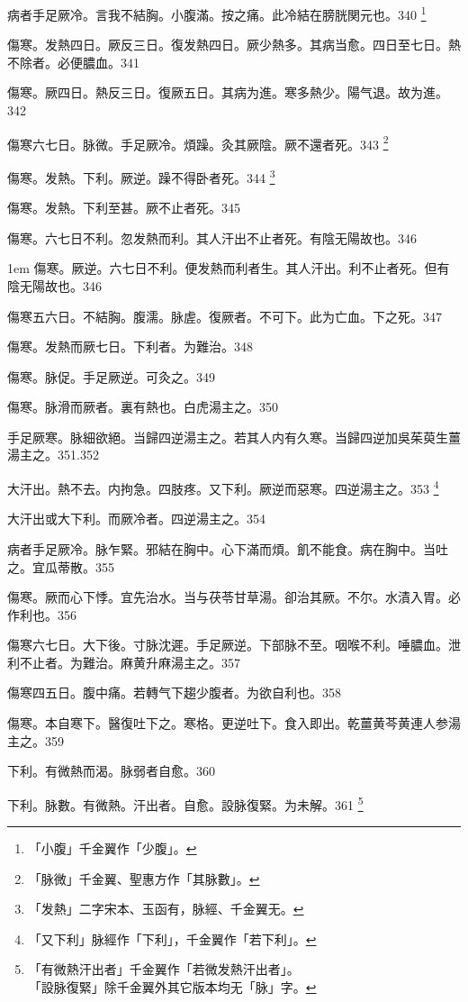 病者手足厥冷。言我不結胸。小腹滿。按之痛。此冷結在膀胱関元也。340
	\footnote{「小腹」千金翼作「少腹」。}

傷寒。发熱四日。厥反三日。復{\khaaitp 发}熱四日。厥少熱多。其病当愈。四日至七日。熱不除者。必便膿血。341

傷寒。厥四日。熱反三日。復厥五日。其病为進。寒多熱少。陽气退。故为進。342

傷寒六七日。脉微。手足厥{\khaaitp 冷}。煩躁。灸其厥陰。厥不還者死。343
	\footnote{「脉微」千金翼、聖惠方作「其脉數」。}

傷寒。{\khaaitp 发熱。}下利。厥逆。躁不得卧者死。344
	\footnote{「发熱」二字宋本、玉函有，脉經、千金翼无。}

傷寒。发熱。下利至{\khaaitp 甚。}厥不止者死。345

傷寒。六七日不利。忽发熱而利。其人汗出不止者死。有陰无陽故也。346

\hangindent 1em
傷寒。厥逆。六七日不利。便发熱而利者生。其人汗出。利不止者死。但有陰无陽故也。{\maijing}346

傷寒五六日。不結胸。腹濡。脉虗。復厥者。不可下。此为亡血。{\khaaitp 下之}死。347

傷寒。发熱而厥七日。下利者。为難治。348

傷寒。脉促。手足厥逆。可灸之。349

傷寒。脉滑而厥者。裏有熱也。白虎湯主之。350

手足厥寒。脉細欲絕。当歸四逆湯主之。若其人内有久寒。当歸四逆加吳茱萸生薑湯主之。351.352

大汗出。熱不去。内拘急。四肢疼。{\khaaitp 又}下利。厥逆而惡寒。四逆湯主之。353
	\footnote{「又下利」脉經作「下利」，千金翼作「若下利」。}

大汗{\khaaitp 出}或大下利。而厥冷者。四逆湯主之。354

病者手足厥冷。脉乍緊。邪結在胸中。心下滿而煩。飢不能食。病在胸中。当吐之。宜瓜蒂散。355

傷寒。厥而心下悸。宜先治水。当与茯苓甘草湯。卻治其厥。不尔。水漬入胃。必作利也。356

傷寒六七日。大下後。{\khaaitp 寸}脉沈遲。手足厥逆。下部脉不至。咽喉不利。唾膿血。泄利不止者。为難治。麻黄升麻湯主之。357

傷寒四五日。腹中痛。若轉气下趨少腹者。为欲自利也。358

傷寒。本自寒下。醫復吐{\khaaitp 下}之。寒格。更逆吐{\khaaitp 下}。食入即出。乾薑黄芩黄連人参湯主之。359

下利。有微熱而渴。脉弱者自愈。360

下利。脉數。有微熱。汗出者。自愈。設{\khaaitp 脉}復緊。为未解。361
	\footnote{「有微熱汗出者」千金翼作「若微发熱汗出者」。\\「設脉復緊」除千金翼外其它版本均无「脉」字。}

